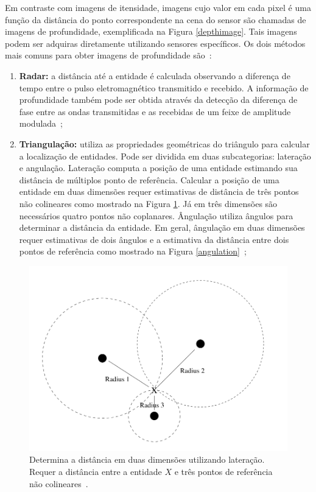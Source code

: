 	Em contraste com imagens de itensidade, imagens cujo valor em cada pixel é uma função da distância do ponto correspondente na cena do sensor são chamadas de imagens de profundidade, exemplificada na Figura \ref{depthimage}. Tais imagens podem ser adquiras diretamente utilizando sensores específicos. Os dois métodos mais comuns para obter imagens de profundidade são~\cite{jain}:

		\begin{enumerate}
			\item \textbf{Radar:} a distância até a entidade é calculada observando a diferença de tempo entre o pulso eletromagnético transmitido e recebido. A informação de profundidade também pode ser obtida através da detecção da diferença de fase entre as ondas transmitidas e as recebidas de um feixe de amplitude modulada~\cite{jain};
			\item \textbf{Triangulação:} utiliza as propriedades geométricas do triângulo para calcular a localização de entidades. Pode ser dividida em duas subcategorias: lateração e angulação. Lateração computa a posição de uma entidade estimando sua distância de múltiplos ponto de referência. Calcular a posição de uma entidade em duas dimensões requer estimativas de distância de três pontos não colineares como mostrado na Figura \ref{lateration}. Já em três dimensões são necessários quatro pontos não coplanares. Ângulação utiliza ângulos para determinar a distância da entidade. Em geral, ângulação em duas dimensões requer estimativas de dois ângulos e a estimativa da distância entre dois pontos de referência como mostrado na Figura \ref{angulation}~\cite{triangulacao};
		\end{enumerate}

		\begin{figure}[hbt]
		\begin{center}
			\includegraphics[scale=0.2]{figuras/2.FundamentacaoTeorica/lateration.png}
		\end{center}
		\caption{Determina a distância em duas dimensões utilizando lateração. Requer a distância entre a entidade $\displaystyle X$ e três pontos de referência não colineares~\cite{triangulacao}.}
		\label{lateration}
	\end{figure}

